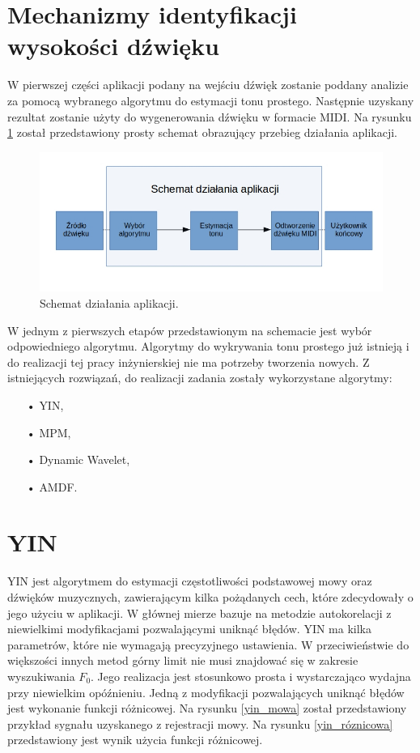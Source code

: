 \section{{Mechanizmy identyfikacji wysokości dźwięku}}
 W pierwszej części aplikacji podany na wejściu dźwięk zostanie poddany analizie za pomocą wybranego algorytmu do estymacji tonu prostego. Następnie uzyskany rezultat zostanie użyty do wygenerowania dźwięku w formacie MIDI. Na rysunku \ref{schemat} został przedstawiony prosty schemat obrazujący przebieg działania aplikacji.
 
 
 \begin{figure}[h!]
  \centering
  \includegraphics[width=0.5\linewidth]{rys/schematAplikacji}
  \caption{Schemat działania aplikacji.}
  \label{schemat}
\end{figure}


W jednym z pierwszych etapów przedstawionym na schemacie jest wybór odpowiedniego algorytmu. Algorytmy do wykrywania tonu prostego już istnieją i do realizacji tej pracy inżynierskiej nie ma potrzeby tworzenia nowych. Z istniejących rozwiązań, do realizacji zadania zostały wykorzystane algorytmy:

\begin{itemize}
\item[•]{YIN,}
\item[•]{MPM,}
\item[•]{Dynamic Wavelet,}
\item[•]{AMDF.}
\end{itemize}
 \section{{YIN}}
 YIN \cite{YIN} jest algorytmem do estymacji częstotliwości podstawowej mowy oraz dźwięków muzycznych, zawierającym kilka pożądanych cech, które zdecydowały o jego użyciu w aplikacji. W głównej mierze bazuje na metodzie autokorelacji z niewielkimi modyfikacjami pozwalającymi uniknąć błędów. YIN ma kilka parametrów, które nie wymagają precyzyjnego ustawienia. W przeciwieństwie do większości innych metod górny limit nie musi znajdować się w zakresie wyszukiwania $F_0$. Jego realizacja jest stosunkowo prosta i wystarczająco wydajna przy niewielkim opóźnieniu. Jedną z modyfikacji pozwalających uniknąć błędów jest wykonanie funkcji różnicowej. Na rysunku \ref{yin_mowa} został przedstawiony przykład sygnału uzyskanego z rejestracji mowy. Na rysunku \ref{yin_róznicowa} przedstawiony jest wynik użycia funkcji różnicowej.
 
